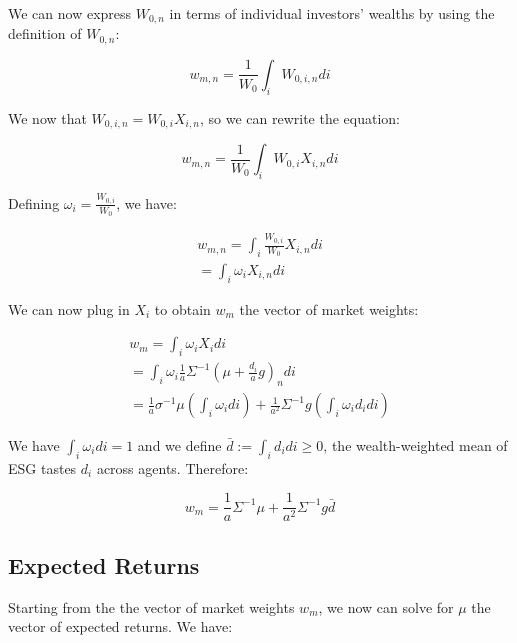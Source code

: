 We can now express $W_{0,n}$ in terms of individual investors' wealths
by using the definition of $W_{0,n}$:

\begin{equation}
    w_{m,n} = \frac{1}{W_0} \int_i W_{0,i,n} di
\end{equation}

We now that $W_{0,i,n} = W_{0,i} X_{i,n}$, so we can rewrite the equation:

\begin{equation}
    w_{m,n} = \frac{1}{W_0} \int_i W_{0,i} X_{i,n} di
\end{equation}

Defining $\omega_i = \frac{W_{0,i}}{W_0}$, we have:

\begin{equation}
    \begin{aligned}
    w_{m,n} = \int_i \frac{W_{0,i}}{W_0} X_{i,n} di\\
    = \int_i \omega_i X_{i,n} di
    \end{aligned}
\end{equation}

We can now plug in $X_i$ to obtain $w_m$ the vector 
of market weights: 

\begin{equation}
    \begin{aligned}
    w_{m} = \int_i \omega_i X_i di \\ 
     = \int_i \omega_i \frac{1}{a} \Sigma^{-1}(\mu + \frac{d_i}{a}g)_n di \\
     = \frac{1}{a} \sigma^{-1} \mu (\int_i \omega_i di) + \frac{1}{a^2} \Sigma^{-1} g (\int_i \omega_i d_i di)
    \end{aligned}
\end{equation}


We have $\int_i \omega_i di = 1$ and we define $\bar{d} := \int_i d_i di \geq 0$,
the wealth-weighted mean of ESG tastes $d_i$ across agents. Therefore:

\begin{equation}
    w_m = \frac{1}{a} \Sigma^{-1} \mu + \frac{1}{a^2} \Sigma^{-1} g \bar{d}
\end{equation}

\subsection{Expected Returns}

Starting from the the vector of market weights $w_m$, we now can 
solve for $\mu$ the vector of expected returns. We have:

